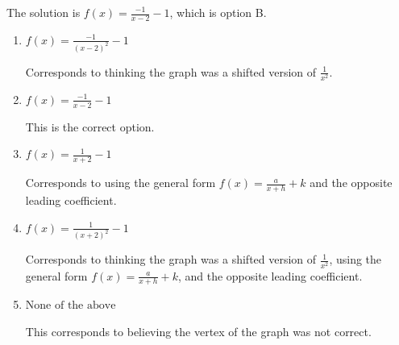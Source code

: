 \documentclass{extbook}[14pt]
\begin{document}
\begin{enumerate}
{The solution is \( f(x) = \frac{-1}{x - 2} - 1 \), which is option B.\begin{enumerate}[label=\Alph*.]
\item \( f(x) = \frac{-1}{(x - 2)^2} - 1 \)

Corresponds to thinking the graph was a shifted version of $\frac{1}{x^2}$.
\item \( f(x) = \frac{-1}{x - 2} - 1 \)

This is the correct option.
\item \( f(x) = \frac{1}{x + 2} - 1 \)

Corresponds to using the general form $f(x) = \frac{a}{x+h}+k$ and the opposite leading coefficient.
\item \( f(x) = \frac{1}{(x + 2)^2} - 1 \)

Corresponds to thinking the graph was a shifted version of $\frac{1}{x^2}$, using the general form $f(x) = \frac{a}{x+h}+k$, and the opposite leading coefficient.
\item \( \text{None of the above} \)

This corresponds to believing the vertex of the graph was not correct.
\end{enumerate}

}
\end{enumerate}
\end{document}
